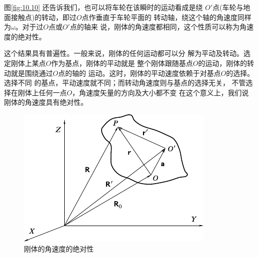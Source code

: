 图\ref{fig:10.10} 还告诉我们，也可以将车轮在该瞬时的运动看成是绕
$ O' $点(车轮与地面接触点)的转动，即过$ O $点作垂直于车轮平面的
转动轴，绕这个轴的角速度同样为$ \omega $。对于过$ O $点或$ O' $点的轴来
说，刚体的角速度都相同，这个性质可以称为角速度的绝对性。

这个结果具有普遍性。一般来说，刚体的任何运动都可以分
解为平动及转动。选定刚体上某点$ O $作为基点，刚体的平动就是
整个刚体跟随基点$ O $的运动，刚体的转动就是围绕通过$ O $点的轴的
运动。这时，刚体的平动速度依赖于对基点$ O $的选择。选择不同
的基点，平动速度就不同；而转动角速度则与基点的选择无关，
不管选择在刚体上任何一点$ O $，角速度矢量的方向及大小都不变
在这个意义上，我们说刚体的角速度具有绝对性。

\begin{figure}[h]
  \centering
  \includegraphics{figure/fig10.11}
  \caption{刚体的角速度的绝对性}
  \label{fig:10.11}
\end{figure}

